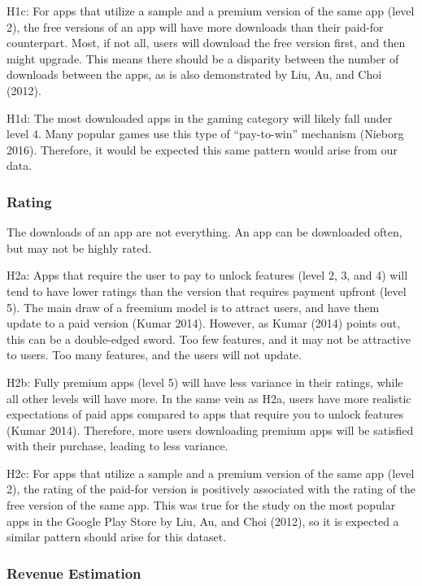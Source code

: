 \documentclass[
  12pt,
  a4paper,
]{article}
\begin{document}
H1c: For apps that utilize a sample and a premium version of the same
app (level 2), the free versions of an app will have more downloads than
their paid-for counterpart. Most, if not all, users will download the
free version first, and then might upgrade. This means there should be a
disparity between the number of downloads between the apps, as is also
demonstrated by Liu, Au, and Choi (2012).

H1d: The most downloaded apps in the gaming category will likely fall
under level 4. Many popular games use this type of ``pay-to-win''
mechanism (Nieborg 2016). Therefore, it would be expected this same
pattern would arise from our data.

\subsubsection{Rating}\label{rating}

The downloads of an app are not everything. An app can be downloaded
often, but may not be highly rated.

H2a: Apps that require the user to pay to unlock features (level 2, 3,
and 4) will tend to have lower ratings than the version that requires
payment upfront (level 5). The main draw of a freemium model is to
attract users, and have them update to a paid version (Kumar 2014).
However, as Kumar (2014) points out, this can be a double-edged sword.
Too few features, and it may not be attractive to users. Too many
features, and the users will not update.

H2b: Fully premium apps (level 5) will have less variance in their
ratings, while all other levels will have more. In the same vein as H2a,
users have more realistic expectations of paid apps compared to apps
that require you to unlock features (Kumar 2014). Therefore, more users
downloading premium apps will be satisfied with their purchase, leading
to less variance.

H2c: For apps that utilize a sample and a premium version of the same
app (level 2), the rating of the paid-for version is positively
associated with the rating of the free version of the same app. This was
true for the study on the most popular apps in the Google Play Store by
Liu, Au, and Choi (2012), so it is expected a similar pattern should
arise for this dataset.

\subsubsection{Revenue Estimation}\label{revenue-estimation}
\end{document}
